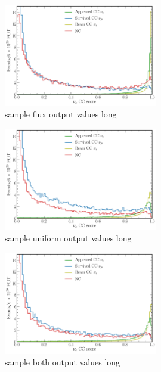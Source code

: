 \begin{figure} %
    \includegraphics[width=0.6\textwidth]{diagrams/7-cvn/chipsnet/sample_flux_output_values.pdf}
    \caption[sample flux output values short]
    {sample flux output values long}
    \label{fig:sample_flux_output_values}
\end{figure}

\begin{figure} %
    \includegraphics[width=0.6\textwidth]{diagrams/7-cvn/chipsnet/sample_uniform_output_values.pdf}
    \caption[sample uniform output values short]
    {sample uniform output values long}
    \label{fig:sample_uniform_output_values}
\end{figure}

\begin{figure} %
    \includegraphics[width=0.6\textwidth]{diagrams/7-cvn/chipsnet/sample_both_output_values.pdf}
    \caption[sample both output values short]
    {sample both output values long}
    \label{fig:sample_both_output_values}
\end{figure}

